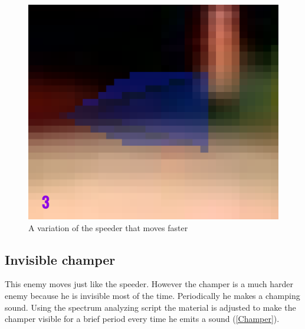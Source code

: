 \begin{figure}[p]
  \centering
  \includegraphics[width=\imgWidth]{images/game_systems/FastSpeeder.png}
  \caption{A variation of the speeder that moves faster}
  \label{FastSpeeder}
\end{figure}


\subsection{Invisible champer}\label{InvisibleChamper}
This enemy moves just like the speeder. However the champer is a much harder enemy because he is invisible most of the time. Periodically he makes a champing sound. Using the spectrum analyzing script the material is adjusted to make the champer visible for a brief period every time he emits a sound (\cref{Champer}).

